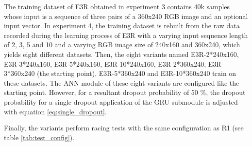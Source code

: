 The training dataset of E3R obtained in experiment 3
contains 40k samples 
whose input is a sequence of 
three pairs of a 360x240 RGB image 
and an optional input vector.
In experiment 4, 
the training dataset is rebuilt from the raw data
recorded during the learning process of E3R
with a varying input sequence length of 
2, 3, 5 and 10
and a varying RGB image size of 
240x160 and 360x240,
which yields eight different datasets.
Then, 
the eight variants
named 
E3R-2*240x160,
E3R-3*240x160,
E3R-5*240x160,
E3R-10*240x160,
E3R-2*360x240,
E3R-3*360x240 (the starting point),
E3R-5*360x240
and
E3R-10*360x240
train on these datasets.
The ANN module of these eight variants
are configured like the starting point.
However, for a resultant dropout probability
of 50 \%, the dropout probability
for a single dropout application of the GRU submodule
is adjusted with equation \ref{eq:single_dropout}.

Finally,
the variants perform
racing tests with the same
configuration as R1 (see table \ref{tab:test_config}).









